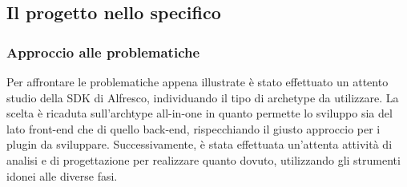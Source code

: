 \subsection{Il progetto nello specifico}
 \subsubsection{Approccio alle problematiche}
Per affrontare le problematiche appena illustrate è stato effettuato un attento studio
della SDK di Alfresco, individuando il tipo di archetype da utilizzare. La scelta è
ricaduta sull’archtype all-in-one in quanto permette lo sviluppo sia del lato front-end
che di quello back-end, rispecchiando il giusto approccio per i plugin da sviluppare.
Successivamente, è stata effettuata un’attenta attività di analisi e di progettazione per
realizzare quanto dovuto, utilizzando gli strumenti idonei alle diverse fasi.
